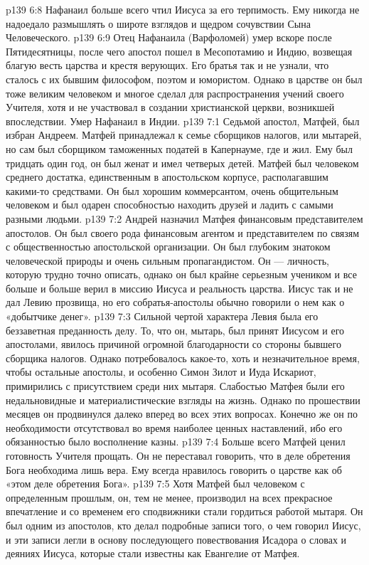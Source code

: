 \vs p139 6:8 \pc Нафанаил больше всего чтил Иисуса за его терпимость. Ему никогда не надоедало размышлять о широте взглядов и щедром сочувствии Сына Человеческого.
\vs p139 6:9 \pc Отец Нафанаила (Варфоломей) умер вскоре после Пятидесятницы, после чего апостол пошел в Месопотамию и Индию, возвещая благую весть царства и крестя верующих. Его братья так и не узнали, что сталось с их бывшим философом, поэтом и юмористом. Однако в царстве он был тоже великим человеком и многое сделал для распространения учений своего Учителя, хотя и не участвовал в создании христианской церкви, возникшей впоследствии. Умер Нафанаил в Индии.
\vs p139 7:1 Седьмой апостол, Матфей, был избран Андреем. Матфей принадлежал к семье сборщиков налогов, или мытарей, но сам был сборщиком таможенных податей в Капернауме, где и жил. Ему был тридцать один год, он был женат и имел четверых детей. Матфей был человеком среднего достатка, единственным в апостольском корпусе, располагавшим какими\hyp{}то средствами. Он был хорошим коммерсантом, очень общительным человеком и был одарен способностью находить друзей и ладить с самыми разными людьми.
\vs p139 7:2 \pc Андрей назначил Матфея финансовым представителем апостолов. Он был своего рода финансовым агентом и представителем по связям с общественностью апостольской организации. Он был глубоким знатоком человеческой природы и очень сильным пропагандистом. Он --- личность, которую трудно точно описать, однако он был крайне серьезным учеником и все больше и больше верил в миссию Иисуса и реальность царства. Иисус так и не дал Левию прозвища, но его собратья\hyp{}апостолы обычно говорили о нем как о «добытчике денег».
\vs p139 7:3 Сильной чертой характера Левия была его беззаветная преданность делу. То, что он, мытарь, был принят Иисусом и его апостолами, явилось причиной огромной благодарности со стороны бывшего сборщика налогов. Однако потребовалось какое\hyp{}то, хоть и незначительное время, чтобы остальные апостолы, и особенно Симон Зилот и Иуда Искариот, примирились с присутствием среди них мытаря. Слабостью Матфея были его недальновидные и материалистические взгляды на жизнь. Однако по прошествии месяцев он продвинулся далеко вперед во всех этих вопросах. Конечно же он по необходимости отсутствовал во время наиболее ценных наставлений, ибо его обязанностью было восполнение казны.
\vs p139 7:4 Больше всего Матфей ценил готовность Учителя прощать. Он не переставал говорить, что в деле обретения Бога необходима лишь вера. Ему всегда нравилось говорить о царстве как об «этом деле обретения Бога».
\vs p139 7:5 \pc Хотя Матфей был человеком с определенным прошлым, он, тем не менее, производил на всех прекрасное впечатление и со временем его сподвижники стали гордиться работой мытаря. Он был одним из апостолов, кто делал подробные записи того, о чем говорил Иисус, и эти записи легли в основу последующего повествования Исадора о словах и деяниях Иисуса, которые стали известны как Евангелие от Матфея.
